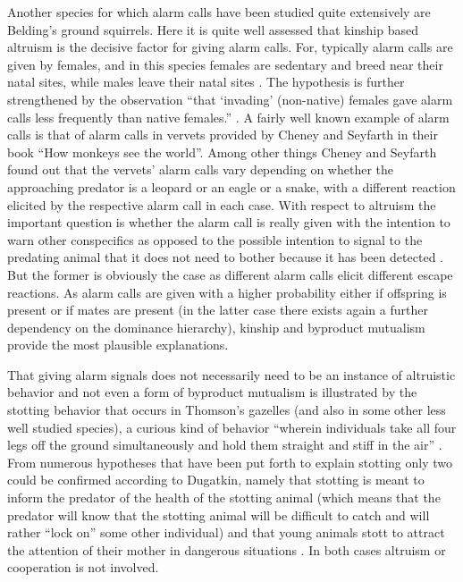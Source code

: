 Another species for which alarm calls have been studied quite extensively are
Belding's ground squirrels. Here it is quite well assessed that kinship based
altruism is the decisive factor for giving alarm calls.  For, typically alarm
calls are given by females, and in this species females are sedentary and breed
near their natal sites, while males leave their natal sites \cite[p.\ 
97/98]{dugatkin:1997}. The hypothesis is further strengthened by the
observation ``that `invading' (non-native) females gave alarm calls less
frequently than native females.'' \cite[p.\  98]{dugatkin:1997}. A fairly well
known example of alarm calls is that of alarm calls in vervets provided by
Cheney and Seyfarth in their book ``How monkeys see the world''. Among other
things Cheney and Seyfarth found out that the vervets' alarm calls vary
depending on whether the approaching predator is a leopard or an eagle or a
snake, with a different reaction elicited by the
respective alarm call in each case. With respect to altruism the important question is
whether the alarm call is really given with the intention to warn other
conspecifics as opposed to the possible intention to signal to the predating
animal that it does not need to bother because it has been detected \cite[p.\ 
136/137.]{dugatkin:1997}. But the former is obviously the case as different
alarm calls elicit different escape reactions. As alarm calls are given with a
higher probability either if offspring is present or if mates are present (in
the latter case there exists again a further dependency on the dominance
hierarchy), kinship and byproduct mutualism provide the most plausible
explanations.

That giving alarm signals does not necessarily need to be an instance of
altruistic behavior and not even a form of byproduct mutualism is illustrated
by the stotting behavior that occurs in Thomson's gazelles (and also in some
other less well studied species), a curious kind of behavior ``wherein
individuals take all four legs off the ground simultaneously and hold them
straight and stiff in the air'' \cite[p.\ 94]{dugatkin:1997}. From numerous
hypotheses that have been put forth to explain stotting only two could be
confirmed according to Dugatkin, namely that stotting is meant to inform the
predator of the health of the stotting animal (which means that the predator
will know that the stotting animal will be difficult to catch and will rather
``lock on'' some other individual) and that young animals stott to attract the
attention of their mother in dangerous situations \cite[p.\ 
95]{dugatkin:1997}. In both cases altruism or cooperation is not involved.

